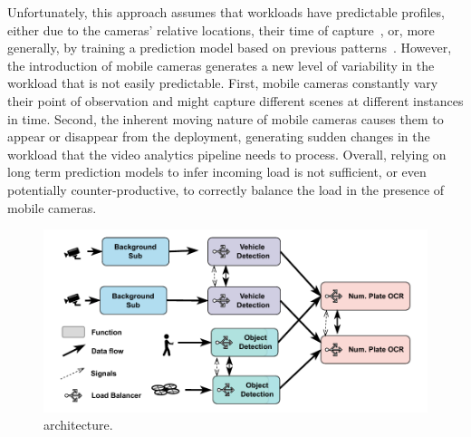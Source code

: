 Unfortunately, this approach assumes that workloads have predictable profiles, either due to the cameras' relative locations, their time of capture~\cite{jiang2018chameleon}, or, more generally, by training a prediction model based on previous patterns~\cite{zeng2020distream}. However, the introduction of mobile cameras generates a new level of variability in the workload that is not easily predictable. First, mobile cameras constantly vary their point of observation and might capture different scenes at different instances in time. Second, the inherent moving nature of mobile cameras causes them to appear or disappear from the deployment, generating sudden changes in the workload that the video analytics pipeline needs to process. Overall, relying on long term prediction models to infer incoming load is not sufficient, or even potentially counter-productive, to correctly balance the load in the presence of mobile cameras.

\begin{figure}
    \centering
    \includegraphics[width=\linewidth]{chapters/videojam/images/architecture.pdf}
    \caption{\videojam{} architecture.}
    \label{fig:architecture}
\end{figure}

